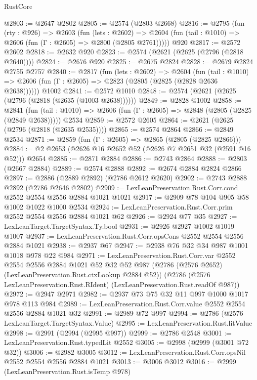 \begin{lexlean}{RustCore}
\begin{coremodule}
@2803 := @2647 @2802
@2805 := @2574 (@2803 @2668)
@2816 := @2795
    (fun (rty : @926) =>
    @2603
      (fun (lets : @2602) =>
      @2604 (fun (tail : @1010) => @2606 (fun (Γ : @2605) => @2800 (@2805 @2761)))))
    @920
@2817 := @2572 @2602
@2818 := @2632 @920
@2823 := @2574 (@2621 (@2625 (@2796 (@2818 @2640))))
@2824 := @2676 @920
@2825 := @2675 @2824
@2828 := @2679 @2824 @2755 @2757
@2840 := @2817
    (fun (lets : @2602) =>
    @2604
      (fun (tail : @1010) => @2606 (fun (Γ : @2605) => @2823 (@2805 (@2825 (@2828 @2636 @2638))))))
    @1002
@2841 := @2572 @1010
@2848 := @2574 (@2621 (@2625 (@2796 (@2818 (@2635 (@1003 @2638))))))
@2849 := @2828 @1002
@2858 := @2841
    (fun (tail : @1010) => @2606 (fun (Γ : @2605) => @2848 (@2805 (@2825 (@2849 @2638)))))
    @2534
@2859 := @2572 @2605
@2864 := @2621 (@2625 (@2796 (@2818 (@2635 @2535))))
@2865 := @2574 @2864
@2866 := @2849 @2534
@2871 := @2859 (fun (Γ : @2605) => @2865 (@2805 (@2825 @2866)))
@2884 := @2 @2653 (@2626 @16 @2652 @52 (@2626 @7 @2651 @32 (@2591 @16 @52))) @2654
@2885 := @2871 @2884
@2886 := @2743 @2864
@2888 := @2803 (@2667 @2884)
@2889 := @2574 @2888
@2892 := @2674 @2884 @2824 @2866
@2897 := @2886 (@2889 @2892) (@2786 @2612 @2620)
@2902 := @2743 @2888 @2892 (@2786 @2646 @2802)
@2909 := LexLeanPreservation.Rust.Corr.cond @2552 @2554 @2556 @2884 @1021 @1021
@2917 := @2909 @78 @104 @905 @58 @1002 @1022 @1000 @2534
@2924 := LexLeanPreservation.Rust.Corr.prim @2552 @2554 @2556 @2884 @1021 @62
@2926 := @2924 @77 @35
@2927 := LexLeanTarget.TargetSyntax.Ty.bool
@2931 := @2926 @2927 @1002 @1019 @1007
@2937 := LexLeanPreservation.Rust.Corr.opsCons @2552 @2554 @2556 @2884 @1021
@2938 := @2937 @67
@2947 := @2938 @76 @32 @34 @987 @1001 @1018 @978 @22 @984
@2971 := LexLeanPreservation.Rust.Corr.var
    @2552
    @2554
    @2556
    @2884
    @1021
    @52
    @32
    @52
    @987
    (@2786 (@2576 @2652) (LexLeanPreservation.Rust.ctxLookup @2884 @52))
    (@2786 (@2576 LexLeanPreservation.Rust.RIdent) (LexLeanPreservation.Rust.readOf @987))
@2972 := @2947 @2971
@2982 := @2937 @73 @75 @32 @11 @997 @1000 @1017 @978 @113 @984
@2989 := LexLeanPreservation.Rust.Corr.value @2552 @2554 @2556 @2884 @1021 @32
@2991 := @2989 @72 @997
@2994 := @2786 (@2576 LexLeanTarget.TargetSyntax.Value)
@2995 := LexLeanPreservation.Rust.litValue
@2998 := @2991 (@2994 (@2995 @997))
@2999 := @2786 @2548
@3001 := LexLeanPreservation.Rust.typedLit @2552
@3005 := @2998 (@2999 (@3001 @72 @32))
@3006 := @2982 @3005
@3012 := LexLeanPreservation.Rust.Corr.opsNil @2552 @2554 @2556 @2884 @1021
@3013 := @3006 @3012
@3016 := @2999 (LexLeanPreservation.Rust.isTemp @978)

\end{coremodule}
\end{lexlean}
